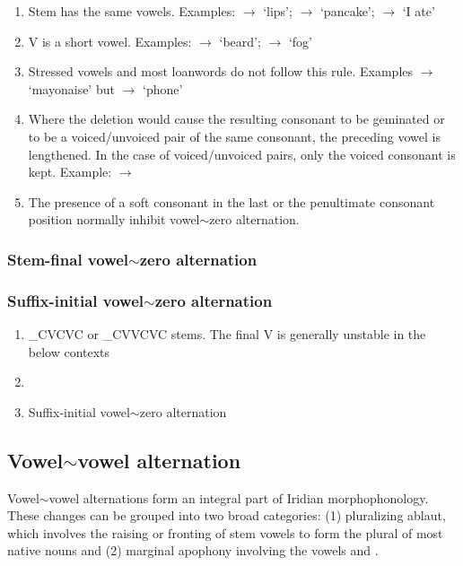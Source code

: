 \begin{enumerate}
	\item Stem has the same vowels. Examples:  $\rightarrow$  `lips';  $\rightarrow$  `pancake';  $\rightarrow$  `I ate'
	\item V is a short vowel. Examples:  $\rightarrow$  `beard';  $\rightarrow$  `fog'
	\item Stressed vowels and most loanwords do not follow this rule. Examples  $\rightarrow$  `mayonaise' but  $\rightarrow$  `phone'
	\item Where the deletion would cause the resulting consonant to be geminated or to be a voiced/unvoiced pair of the same consonant, the preceding vowel is lengthened. In the case of voiced/unvoiced pairs, only the voiced consonant is kept. Example:  $\rightarrow$ 
	\item The presence of a soft consonant in the last or the penultimate consonant position normally inhibit vowel$\sim$zero alternation.
\end{enumerate}


\subsubsection{Stem-final vowel$\sim$zero alternation}

\subsubsection{Suffix-initial vowel$\sim$zero alternation}

\begin{enumerate}
	\item \_CVCVC or \_CVVCVC stems. The final V is generally unstable in the below contexts

	\item
	\item Suffix-initial vowel$\sim$zero alternation
\end{enumerate}

\subsection{Vowel$\sim$vowel alternation}
\par Vowel$\sim$vowel alternations form an integral part of Iridian morphophonology. These changes can be grouped into two broad categories: (1) pluralizing ablaut, which involves the raising or fronting of stem vowels to form the plural of most native nouns and (2) marginal apophony involving the vowels  and .

